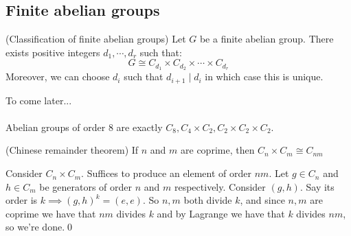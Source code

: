 \documentclass{article}
\begin{document}
\begin{itemize}
\subsection {Finite abelian groups}
\begin{theorem}
	(Classification of finite abelian groups) Let $ G $ be a finite abelian group. There exists positive integers $ d_1,\cdots, d_r $ such that:
	\[
		G\cong C_{d_1}\times C_{d_2}\times \cdots\times C_{d_r}
	\]
	Moreover, we can choose $ d_i $ such that $ d_{i+1}\mid d_i $ in which case this is unique.
\end{theorem}
\pf To come later...\\\\
Abelian groups of order 8 are exactly $ C_8, C_4\times C_2, C_2\times C_2\times C_2 $.
\begin{lemma}
	(Chinese remainder theorem) If $ n $ and $ m $ are coprime, then $ C_n\times C_m\cong C_{nm} $
\end{lemma}
\pf Consider $ C_n\times C_m $. Suffices to produce an element of order $ nm $. Let $ g\in C_n $ and $ h\in C_m $ be generators of order $ n $ and $ m $ respectively. Consider $ (g,h) $. Say its order is $ k\implies (g,h)^k=(e,e) $. So $ n,m $ both divide $ k $, and since $ n,m $ are coprime we have that $ nm $ divides $ k $ and by Lagrange we have that $ k $ divides $ nm $, so we're done.\qed

\end{itemize}
\end{document}
